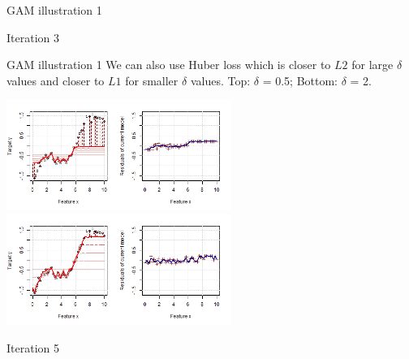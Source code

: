 \begin{frame}{GAM illustration 1}
\begin{center}
{Iteration 3
}
\end{center}

\end{frame}


\begin{frame}{GAM illustration 1}
We can also use Huber loss which is closer to $L2$ for large $\delta$ values and closer to $L1$ for 
smaller $\delta$ values. Top: $\delta$ = 0.5; Bottom: $\delta$ = 2.
\begin{center}
\includegraphics[width=0.55\textwidth]{figure_man/illustration_normal_huber0.5_5.png}
\includegraphics[width=0.55\textwidth]{figure_man/illustration_normal_huber2_5.png}


Iteration 5
\end{center}

\end{frame}



